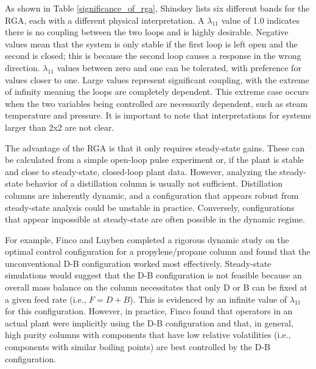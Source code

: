 As shown in Table \ref{significance_of_rga}, Shinskey lists six different bands for the RGA, each with a different physical interpretation.\citep{Shinskey1984} A $\lambda_{11}$ value of 1.0 indicates there is no coupling between the two loops and is highly desirable.   Negative values mean that the system is only stable if the first loop is left open and the second is closed; this is because the second loop causes a response in the wrong direction. $\lambda_{11}$ values between zero and one can be tolerated, with preference for values closer to one. Large values represent significant coupling, with the extreme of infinity meaning the loops are completely dependent. This extreme case occurs when the two variables being controlled are necessarily dependent, such as steam temperature and pressure. It is important to note that interpretations for systems larger than 2x2 are not clear.

The advantage of the RGA is that it only requires steady-state gains. These can be calculated from a simple open-loop pulse experiment or, if the plant is stable and close to steady-state, closed-loop plant data.\citep{Pensar1993} However, analyzing the steady-state behavior of a distillation column is usually not sufficient. Distillation columns are inherently dynamic, and a configuration that appears robust from steady-state analysis could be unstable in practice. Conversely, configurations that appear impossible at steady-state are often possible in the dynamic regime. 


For example, Finco and Luyben completed a rigorous dynamic study on the optimal control configuration for a propylene/propane column and found that the unconventional D-B configuration worked most effectively.\citep{Finco1989} Steady-state simulations would suggest that the D-B configuration is not feasible because an overall mass balance on the column necessitates that only D or B can be fixed at a given feed rate (i.e., $F = D + B$).\citep{Skogestad2007} This is evidenced by an infinite value of $\lambda_{11}$ for this configuration. However, in practice, Finco found that operators in an actual plant were implicitly using the D-B configuration and that, in general, high purity columns with components that have low relative volatilities (i.e., components with similar boiling points) are best controlled by the D-B configuration.\citep{Finco1989}

